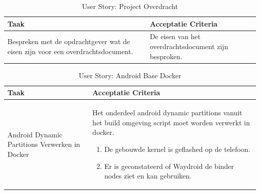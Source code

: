 \documentclass[a4paper]{report}
\newcommand{\userstorycolor}{PeachPuff1}
\begin{document}
  \begin{tcolorbox}[colback=white, coltitle=black, colframe=\userstorycolor, title=\textbf{User Story: }Als opdrachtgever wil ik dat het project gemakkelijk overgedragen kan worden\, zodat een volgend team snel aan de slag kan.]
    \begin{table}[H]
        \centering
      \begin{tabularx}{1\textwidth}{|X|X|}
        \hline
        \cellcolor[HTML]{ffcc99} \textbf{Taak} & \cellcolor[HTML]{ffcc99} \textbf{Acceptatie Criteria} \\ 
        \hline
        Bespreken met de opdrachtgever wat de eisen zijn voor een overdrachtsdocument. & De eisen van het overdrachtsdocument zijn besproken. \\
        \hline
      \end{tabularx}
      \caption{User Story: Project Overdracht}
    \label{table:it7:story_transfer}
    \end{table}
    \end{tcolorbox}
  
    \begin{tcolorbox}[colback=white, coltitle=black, colframe=\userstorycolor, title=\textbf{User Story: }Als developer wil ik het stuk "Sourcing and Building relevant bits of your chosen Android base" verwerken in de Docker container\, om een stap dichter bij een makkelijkere werkomgeving te realiseren.]
    \begin{table}[H]
        \centering
      \begin{tabularx}{1\textwidth}{|X|X|}
        \hline
        \cellcolor[HTML]{ffcc99} \textbf{Taak} & \cellcolor[HTML]{ffcc99} \textbf{Acceptatie Criteria} \\ 
        \hline
        Android Dynamic Partitions Verwerken in Docker & Het onderdeel android dynamic partitions vanuit het build omgeving script moet worden verwerkt in docker. \begin{enumerate}[leftmargin=.4cm, topsep=0cm, itemsep=.2cm]
          \item De gebouwde kernel is geflashed op de telefoon.
          \item Er is geconstateerd of Waydroid de binder nodes ziet en kan gebruiken.
        \end{enumerate}\\ 
        \hline
      \end{tabularx}
      \caption{User Story: Android Base Docker}
    \label{table:it7:story_docker}
    \end{table}
    \end{tcolorbox}
\end{document}
